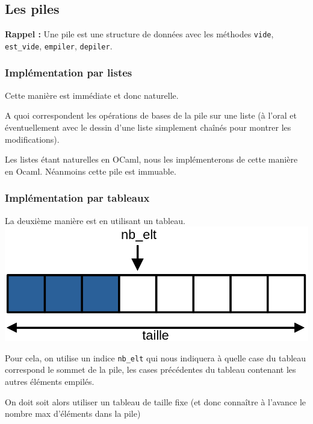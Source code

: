 
\subsection{Les piles}

\textbf{Rappel :} Une pile est une structure de données avec les méthodes \texttt{vide}, \texttt{est\_vide}, \texttt{empiler}, \texttt{depiler}.

\subsubsection{Implémentation par listes}

Cette manière est immédiate et donc naturelle.

\begin{exercise}
	A quoi correspondent les opérations de bases de la pile sur une liste (à l'oral et éventuellement avec le dessin d'une liste simplement chaînés pour montrer les modifications).
\end{exercise}

Les listes étant naturelles en OCaml, nous les implémenterons de cette manière en Ocaml. Néanmoins cette pile est immuable.

\subsubsection{Implémentation par tableaux}

La deuxième manière est en utilisant un tableau. \\

\includegraphics[scale=0.3]{lecon/05-piles_files/piles_tableau.png}
\\

\begin{principe}
	Pour cela, on utilise un indice \texttt{nb\_elt} qui nous indiquera à quelle case du tableau correspond le sommet de la pile, les cases précédentes du tableau contenant les autres éléments empilés.
\end{principe}

\begin{impl}
	On doit soit alors utiliser un tableau de taille fixe (et donc connaître à l'avance le nombre max d'éléments dans la pile)
\end{impl}